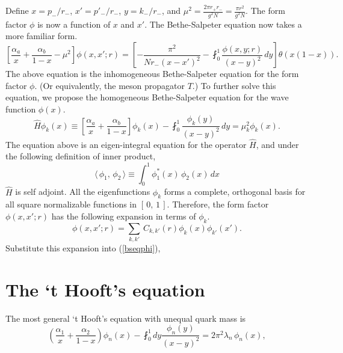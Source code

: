 \documentclass{article}
\newcommand{\bref}[1]{(\ref{#1})}
\begin{document}
Define $x= p_{-}/r_{-}$, $x{}' = p{}'_{-}/r_{-}$, $y = k_{-}/r_{-}$, and $\mu^{2} = \frac{2\pi r_{+}r_{-}}{g^{2}N} = \frac{\pi r^{2}}{g^{2}N}$. The form factor $\phi$ is now a function of $x$ and $x{}'$. The Bethe-Salpeter equation now takes a more familiar form. 
\begin{equation}\label{bseqphi}
    \left[\frac{\alpha_{a}}{x} + \frac{\alpha_{b}}{1-x} - \mu^{2}\right] \phi (x, x{}'; r)  = \left[-\frac{\pi^{2}}{Nr_{-}(x - x{}')^{2}} - \fint_{0}^{1}\frac{\phi (x, y; r)}{(x-y)^{2}}\, dy \right] \theta (x(1-x)).
\end{equation}
The above equation is the inhomogeneous Bethe-Salpeter equation for the form factor $\phi$. (Or equivalently, the meson propagator $T$.) To further solve this equation, we propose the homogeneous Bethe-Salpeter equation for the wave function $\phi(x)$. 
\[ 
    \hat{H}\phi_{k}(x) \equiv \left[\frac{\alpha_{a}}{x}+ \frac{\alpha_{b}}{1-x}\right]  \phi_{k}(x) - \fint_{0}^{1} \frac{\phi_{k}(y)}{(x - y)^{2}}\, dy = \mu_{k}^{2}\phi_{k}(x).
\]
The equation above is an eigen-integral equation for the operator $\hat{H}$, and under the following definition of inner product, \[ 
    \langle \, \phi_{1} ,\, \phi_{2}\, \rangle \equiv  \int_{0}^{1} \phi_{1}^{*}(x)\, \phi_{2}(x)\, dx 
\] 
$\hat{H}$ is self adjoint. All the eigenfunctions $\phi_{k}$ forms a complete, orthogonal basis for all square normalizable functions in $[\, 0, \, 1\, ] $. Therefore, the form factor $\phi(x, x{}'; r)$ has the following expansion in terms of $\phi_{k}$.
\[ 
    \phi(x, x{}'; r) = \sum_{k, k{}'}\, C_{k, k{}'}(r) \phi_{k}(x)\phi_{k{}'}(x{}').
\] 
Substitute this expansion into \bref{bseqphi},  
\section{The `t Hooft's equation}
The most general `t Hooft's equation with unequal quark mass is
\[
	\left(\frac{\alpha_1}{x} + \frac{\alpha_2}{1-x}\right)\phi_n(x) - \fint_{0}^{1}dy \frac{\phi_n(y)}{(x-y)^2} = 2\pi^2 \lambda_n\, \phi_n(x),
\]
\end{document}
